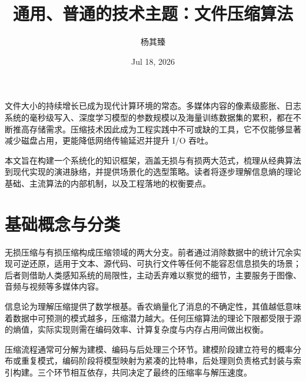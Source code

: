 \title{通用、普通的技术主题：文件压缩算法}
\author{杨其臻}
\date{Jul 18, 2026}
\maketitle
文件大小的持续增长已成为现代计算环境的常态。多媒体内容的像素级膨胀、日志系统的毫秒级写入、深度学习模型的参数规模以及海量训练数据集的累积，都在不断推高存储需求。压缩技术因此成为工程实践中不可或缺的工具，它不仅能够显著减少磁盘占用，更能降低网络传输延迟并提升 I/O 吞吐。\par
本文旨在构建一个系统化的知识框架，涵盖无损与有损两大范式，梳理从经典算法到现代实现的演进脉络，并提供场景化的选型策略。读者将逐步理解信息熵的理论基础、主流算法的内部机制，以及工程落地的权衡要点。\par
\chapter{基础概念与分类}
无损压缩与有损压缩构成压缩领域的两大分支。前者通过消除数据中的统计冗余实现可逆还原，适用于文本、源代码、可执行文件等任何不能容忍信息损失的场景；后者则借助人类感知系统的局限性，主动丢弃难以察觉的细节，主要服务于图像、音频与视频等多媒体内容。\par
信息论为理解压缩提供了数学根基。香农熵量化了消息的不确定性，其值越低意味着数据中可预测的模式越多，压缩潜力越大。任何压缩算法的理论下限都受限于源的熵值，实际实现则需在编码效率、计算复杂度与内存占用间做出权衡。\par
压缩流程通常可分解为建模、编码与后处理三个环节。建模阶段建立符号的概率分布或重复模式，编码阶段将模型映射为紧凑的比特串，后处理则负责格式封装与索引构建。三个环节相互依存，共同决定了最终的压缩率与解压速度。\par
